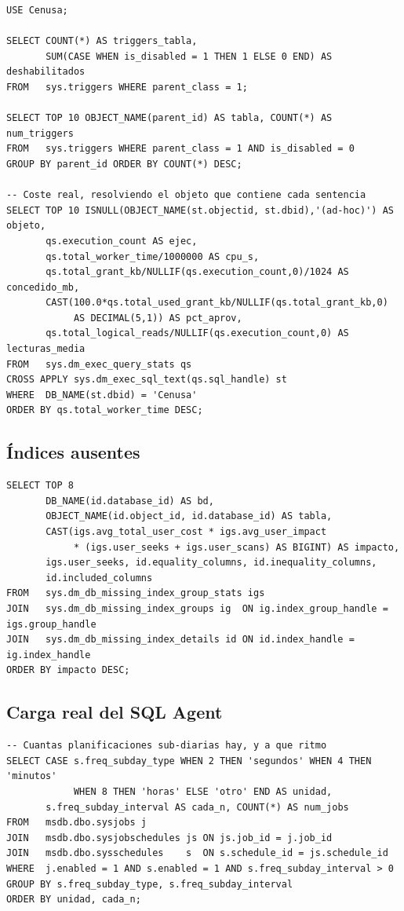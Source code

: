 \documentclass[11pt,a4paper]{article}
\begin{document}
\begin{lstlisting}[style=sql]
USE Cenusa;

SELECT COUNT(*) AS triggers_tabla,
       SUM(CASE WHEN is_disabled = 1 THEN 1 ELSE 0 END) AS deshabilitados
FROM   sys.triggers WHERE parent_class = 1;

SELECT TOP 10 OBJECT_NAME(parent_id) AS tabla, COUNT(*) AS num_triggers
FROM   sys.triggers WHERE parent_class = 1 AND is_disabled = 0
GROUP BY parent_id ORDER BY COUNT(*) DESC;

-- Coste real, resolviendo el objeto que contiene cada sentencia
SELECT TOP 10 ISNULL(OBJECT_NAME(st.objectid, st.dbid),'(ad-hoc)') AS objeto,
       qs.execution_count AS ejec,
       qs.total_worker_time/1000000 AS cpu_s,
       qs.total_grant_kb/NULLIF(qs.execution_count,0)/1024 AS concedido_mb,
       CAST(100.0*qs.total_used_grant_kb/NULLIF(qs.total_grant_kb,0)
            AS DECIMAL(5,1)) AS pct_aprov,
       qs.total_logical_reads/NULLIF(qs.execution_count,0) AS lecturas_media
FROM   sys.dm_exec_query_stats qs
CROSS APPLY sys.dm_exec_sql_text(qs.sql_handle) st
WHERE  DB_NAME(st.dbid) = 'Cenusa'
ORDER BY qs.total_worker_time DESC;
\end{lstlisting}

\subsection{Índices ausentes}

\begin{lstlisting}[style=sql]
SELECT TOP 8
       DB_NAME(id.database_id) AS bd,
       OBJECT_NAME(id.object_id, id.database_id) AS tabla,
       CAST(igs.avg_total_user_cost * igs.avg_user_impact
            * (igs.user_seeks + igs.user_scans) AS BIGINT) AS impacto,
       igs.user_seeks, id.equality_columns, id.inequality_columns,
       id.included_columns
FROM   sys.dm_db_missing_index_group_stats igs
JOIN   sys.dm_db_missing_index_groups ig  ON ig.index_group_handle = igs.group_handle
JOIN   sys.dm_db_missing_index_details id ON id.index_handle = ig.index_handle
ORDER BY impacto DESC;
\end{lstlisting}

\subsection{Carga real del SQL Agent}
\label{sql:ocupacion}

\begin{lstlisting}[style=sql]
-- Cuantas planificaciones sub-diarias hay, y a que ritmo
SELECT CASE s.freq_subday_type WHEN 2 THEN 'segundos' WHEN 4 THEN 'minutos'
            WHEN 8 THEN 'horas' ELSE 'otro' END AS unidad,
       s.freq_subday_interval AS cada_n, COUNT(*) AS num_jobs
FROM   msdb.dbo.sysjobs j
JOIN   msdb.dbo.sysjobschedules js ON js.job_id = j.job_id
JOIN   msdb.dbo.sysschedules    s  ON s.schedule_id = js.schedule_id
WHERE  j.enabled = 1 AND s.enabled = 1 AND s.freq_subday_interval > 0
GROUP BY s.freq_subday_type, s.freq_subday_interval
ORDER BY unidad, cada_n;
\end{lstlisting}
\end{document}
